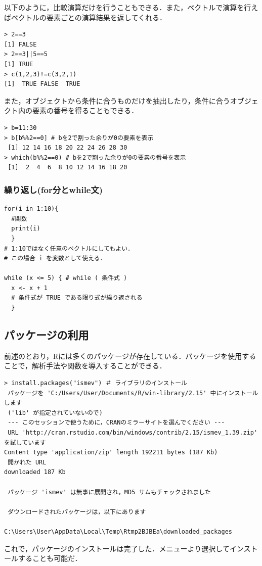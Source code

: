 \documentclass[a4paper,10pt,fleqn]{jarticle}
\begin{document}
以下のように，比較演算だけを行うこともできる．また，ベクトルで演算を行えばベクトルの要素ごとの演算結果を返してくれる．
\begin{breakbox}
\begin{verbatim}
> 2==3
[1] FALSE
> 2==3||5==5
[1] TRUE
> c(1,2,3)!=c(3,2,1)
[1]  TRUE FALSE  TRUE
\end{verbatim}
\end{breakbox}

また，オブジェクトから条件に合うものだけを抽出したり，条件に合うオブジェクト内の要素の番号を得ることもできる．
\begin{breakbox}
\begin{verbatim}
> b=11:30
> b[b%%2==0] # bを2で割った余りが0の要素を表示
 [1] 12 14 16 18 20 22 24 26 28 30
> which(b%%2==0) # bを2で割った余りが0の要素の番号を表示
 [1]  2  4  6  8 10 12 14 16 18 20
\end{verbatim}
\end{breakbox}
\subsubsection{繰り返し(for分とwhile文)}
\begin{screen}
\begin{verbatim}
for(i in 1:10){
  #関数
  print(i)
  }
# 1:10ではなく任意のベクトルにしてもよい．
# この場合 i を変数として使える．

while (x <= 5) { # while ( 条件式 )
  x <- x + 1
  # 条件式が TRUE である限り式が繰り返される
  } 

\end{verbatim}
\end{screen}
\subsection{パッケージの利用}
前述のとおり，Rには多くのパッケージが存在している．パッケージを使用することで，解析手法や関数を導入することができる．
\begin{breakbox}
\begin{verbatim}
> install.packages("ismev") ＃ ライブラリのインストール
 パッケージを 'C:/Users/User/Documents/R/win-library/2.15' 中にインストールします 
 ('lib' が指定されていないので) 
 --- このセッションで使うために，CRANのミラーサイトを選んでください --- 
 URL 'http://cran.rstudio.com/bin/windows/contrib/2.15/ismev_1.39.zip' を試しています 
Content type 'application/zip' length 192211 bytes (187 Kb)
 開かれた URL 
downloaded 187 Kb

 パッケージ 'ismev' は無事に展開され，MD5 サムもチェックされました 

 ダウンロードされたパッケージは，以下にあります 
        C:\Users\User\AppData\Local\Temp\Rtmp2BJBEa\downloaded_packages 
\end{verbatim}
\end{breakbox}
これで，パッケージのインストールは完了した．メニューより選択してインストールすることも可能だ．
\end{document}
